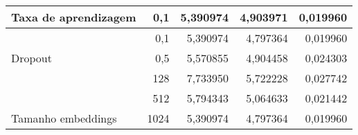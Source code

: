 \begin{table}[]
{\begin{tabular}{lr|rrr}
            \multicolumn{1}{l|}{\multirow{-3}{*}{Taxa de aprendizagem}}                                               & 0,1                                                                                                                    & \multicolumn{1}{r|}{\cellcolor[HTML]{FFF5E1}5,390974}                                                                 & \multicolumn{1}{r|}{4,903971}                                    & \cellcolor[HTML]{FFF5E1}0,019960 \\ \hline
            \multicolumn{1}{l|}{}                                                                                     & 0,1                                                                                                                    & \multicolumn{1}{r|}{\cellcolor[HTML]{FFF5E1}5,390974}                                                                 & \multicolumn{1}{r|}{\cellcolor[HTML]{FFF5E1}4,797364}            & \cellcolor[HTML]{FFF5E1}0,019960 \\
            \multicolumn{1}{l|}{\multirow{-2}{*}{Dropout}}                                                            & 0,5                                                                                                                    & \multicolumn{1}{r|}{5,570855}                                                                                         & \multicolumn{1}{r|}{4,904458}                                    & 0,024303                         \\ \hline
            \multicolumn{1}{l|}{}                                                                                     & 128                                                                                                                    & \multicolumn{1}{r|}{7,733950}                                                                                         & \multicolumn{1}{r|}{5,722228}                                    & 0,027742                         \\
            \multicolumn{1}{l|}{}                                                                                     & 512                                                                                                                    & \multicolumn{1}{r|}{5,794343}                                                                                         & \multicolumn{1}{r|}{5,064633}                                    & 0,021442                         \\
            \multicolumn{1}{l|}{\multirow{-3}{*}{Tamanho embeddings}}                                                 & 1024                                                                                                                   & \multicolumn{1}{r|}{\cellcolor[HTML]{FFF5E1}5,390974}                                                                 & \multicolumn{1}{r|}{\cellcolor[HTML]{FFF5E1}4,797364}            & \cellcolor[HTML]{FFF5E1}0,019960 \\ \hline

\end{tabular}}
\end{table}
